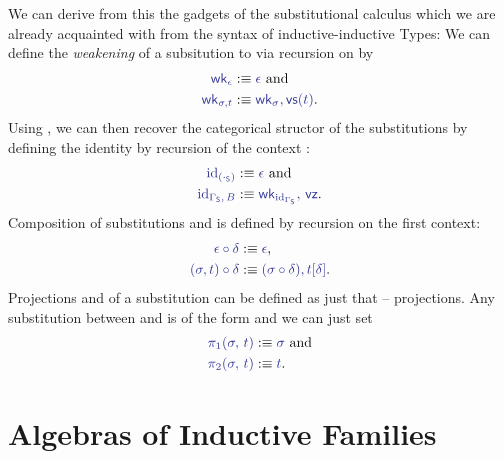 \begin{defn}
We can derive from this the gadgets of the substitutional calculus which we
are already acquainted with from the syntax of inductive-inductive Types:
We can define the \emph{weakening} of a subsitution
\tqm{\IFSub{\sigma}{\Gamma_\Sc}{\Delta_\Sc}} to 
 via recursion on \tqm{\sigma} by
\begin{align*}
\tqm{\wk_\epsilon} 				&:\equiv \tqm{\epsilon} \text{ and} \\
\tqm{\wk_{\sigma, t}}				&:\equiv \tqm{\wk_\sigma, \vs(t)} \text{.}
\end{align*}
Using \tqm{\wk}, we can then recover the categorical structor of the substitutions
by defining the identity \tqm{\IFSub{\id_{\Gamma_\Sc}}{\Gamma_\Sc}{\Gamma_\Sc}}
by recursion of the context \tqm{\Gamma_\Sc}:
\begin{align*}
\tqm{\id_{(\cdot_\Sc)}}				&:\equiv \tqm{\epsilon} \text{ and} \\
\tqm{\id_{\Gamma_\Sc,\, B}}			&:\equiv \tqm{\wk_{\id_{\Gamma_\Sc}},\, \vz} \text{.}
\end{align*}
Composition \tqm{\IFSub{\sigma \circ \delta}{\Gamma_\Sc}{\Sigma_\Sc}} of substitutions
\tqm{\IFSub{\sigma}{\Delta_\Sc}{\Sigma_\Sc}} and \tqm{\IFSub{\delta}{\Gamma_\Sc}{\Delta_\Sc}}
is defined by recursion on the first context:
\begin{align*}
\tqm{\epsilon \circ \delta}			&:\equiv \tqm{\epsilon} \text{,} \\
\tqm{(\sigma, t) \circ \delta}			&:\equiv \tqm{(\sigma \circ \delta), t[\delta]} \text{.}
\end{align*}
Projections  and
 of a substitution
 can be defined as just that --
projections.
Any substitution between \tqm{\Gamma_\Sc} and  is of the form
 and we can just set
\begin{align*}
\tqm{\pi_1(\sigma,\, t)}				&:\equiv \tqm{\sigma} \text{ and} \\
\tqm{\pi_2(\sigma,\, t)}				&:\equiv \tqm{t} \text{.}
\end{align*}
\end{defn}


\section{Algebras of Inductive Families}

